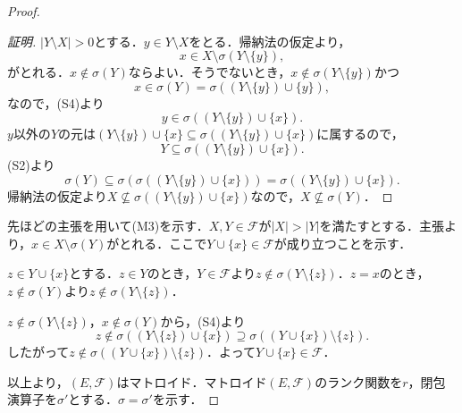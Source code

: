 \documentclass[xelatex,ja=standard,a4paper,14pt,everyparhook=compat]{bxjsarticle}
\theoremstyle{definition}
\renewcommand{\proofname}{\textup{証明}}
\newenvironment{subproof}[1][\proofname]{%
    \begin{proof}[#1]%
    \renewcommand*{\qedsymbol}{$\blacksquare$}
}{%
    \end{proof}
}
\begin{document}
\begin{proof}
\begin{subproof}
        $|Y \setminus X| > 0$とする．$y \in Y \setminus X$をとる．帰納法の仮定より， \begin{equation*}
            x \in X \setminus \sigma(Y \setminus \{y\}),
        \end{equation*}
        がとれる．$x \notin \sigma(Y)$ならよい．そうでないとき，$x \notin \sigma(Y \setminus \{y\})$かつ \begin{equation*}
            x \in \sigma(Y) = \sigma((Y \setminus \{y\}) \cup \{y\}),
        \end{equation*}
        なので，(S4)より \begin{equation*}
            y \in \sigma((Y \setminus \{y\}) \cup \{x\}).
        \end{equation*}
        $y$以外の$Y$の元は$(Y \setminus \{y\}) \cup \{x\} \subseteq \sigma((Y \setminus \{y\}) \cup \{x\})$に属するので， \begin{equation*}
            Y \subseteq \sigma((Y \setminus \{y\}) \cup \{x\}).
        \end{equation*}
        (S2)より \begin{equation*}
            \sigma(Y) \subseteq \sigma(\sigma((Y \setminus \{y\}) \cup \{x\})) = \sigma((Y \setminus \{y\}) \cup \{x\}).
        \end{equation*}
        帰納法の仮定より$X \not\subseteq \sigma((Y \setminus \{y\}) \cup \{x\})$なので，$X \not\subseteq \sigma(Y)$．
    \end{subproof}

    \newpage

    先ほどの主張を用いて(M3)を示す．$X, Y \in \mathcal{F}$が$|X| > |Y|$を満たすとする．主張より，$x \in X \setminus \sigma(Y)$がとれる．ここで$Y \cup \{x\} \in \mathcal{F}$が成り立つことを示す．

    $z \in Y \cup \{x\}$とする．$z \in Y$のとき，$Y \in \mathcal{F}$より$z \notin \sigma(Y \setminus \{z\})$．$z = x$のとき，$z \notin \sigma(Y)$より$z \notin \sigma(Y \setminus \{z\})$．

    $z \notin \sigma(Y \setminus \{z\})$，$x \notin \sigma(Y)$から，(S4)より \begin{equation*}
        z \notin \sigma((Y \setminus \{z\}) \cup \{x\}) \supseteq \sigma((Y \cup \{x\}) \setminus \{z\}).
    \end{equation*}
    したがって$z \notin \sigma((Y \cup \{x\}) \setminus \{z\})$．よって$Y \cup \{x\} \in \mathcal{F}$．

    以上より，$(E, \mathcal{F})$はマトロイド．マトロイド$(E, \mathcal{F})$のランク関数を$r$，閉包演算子を$\sigma'$とする．$\sigma = \sigma'$を示す．


\end{proof}
\end{document}
